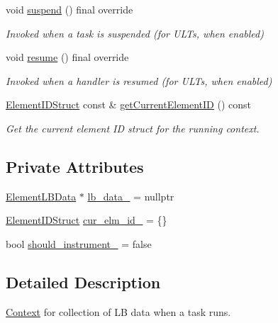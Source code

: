 \begin{DoxyCompactItemize}
void \hyperlink{structvt_1_1ctx_1_1_l_b_data_a6802bb44bd821fe9836f5265bcbfb549}{suspend} () final override
\begin{DoxyCompactList}\small\item\em Invoked when a task is suspended (for U\+L\+Ts, when enabled) \end{DoxyCompactList}\item 
void \hyperlink{structvt_1_1ctx_1_1_l_b_data_a6910cc378cef1690e61fbbb97dc1524c}{resume} () final override
\begin{DoxyCompactList}\small\item\em Invoked when a handler is resumed (for U\+L\+Ts, when enabled) \end{DoxyCompactList}\item 
\hyperlink{structvt_1_1ctx_1_1_l_b_data_aad9fac05c3faf80173b273d900db6fb1}{Element\+I\+D\+Struct} const  \& \hyperlink{structvt_1_1ctx_1_1_l_b_data_ac2f63d7854e0c1d4c1c2b9ddf200f8c6}{get\+Current\+Element\+ID} () const
\begin{DoxyCompactList}\small\item\em Get the current element ID struct for the running context. \end{DoxyCompactList}\end{DoxyCompactItemize}
\subsection*{Private Attributes}
\begin{DoxyCompactItemize}
\item 
\hyperlink{structvt_1_1ctx_1_1_l_b_data_a11f1aeb75c01ae0c77d96f94ce1994bb}{Element\+L\+B\+Data} $\ast$ \hyperlink{structvt_1_1ctx_1_1_l_b_data_a766b2b0aa69889fc3e397c7bfbb0b68a}{lb\+\_\+data\+\_\+} = nullptr
\item 
\hyperlink{structvt_1_1ctx_1_1_l_b_data_aad9fac05c3faf80173b273d900db6fb1}{Element\+I\+D\+Struct} \hyperlink{structvt_1_1ctx_1_1_l_b_data_a8d84887a884c7f5783d4ccd7e5effd92}{cur\+\_\+elm\+\_\+id\+\_\+} = \{\}
\item 
bool \hyperlink{structvt_1_1ctx_1_1_l_b_data_a0f36387b1ed5d20e39b72e97251e0efc}{should\+\_\+instrument\+\_\+} = false
\end{DoxyCompactItemize}


\subsection{Detailed Description}
\hyperlink{structvt_1_1ctx_1_1_context}{Context} for collection of LB data when a task runs. 

